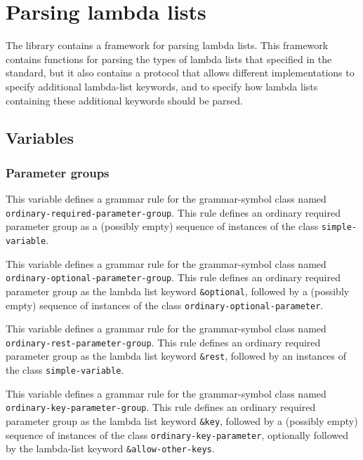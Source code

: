 \chapter{Parsing lambda lists}
\label{chap-user-parsing-lambda-lists}

The \sysname{} library contains a framework for parsing lambda lists.
This framework contains functions for parsing the types of lambda
lists that specified in the \commonlisp{} standard, but it also
contains a protocol that allows different implementations to specify
additional lambda-list keywords, and to specify how lambda lists
containing these additional keywords should be parsed.

\section{Variables}

\subsection{Parameter groups}


This variable defines a grammar rule for the grammar-symbol class
named \texttt{ordinary-required-parameter-group}.  This rule defines
an ordinary required parameter group as a (possibly empty) sequence of
instances of the class \texttt{simple-variable}.


This variable defines a grammar rule for the grammar-symbol class
named \texttt{ordinary-optional-parameter-group}.  This rule defines
an ordinary required parameter group as the lambda list keyword
\texttt{\&optional}, followed by a (possibly empty) sequence of
instances of the class \texttt{ordinary-optional-parameter}.


This variable defines a grammar rule for the grammar-symbol class
named \texttt{ordinary-rest-parameter-group}.  This rule defines an
ordinary required parameter group as the lambda list keyword
\texttt{\&rest}, followed by an instances of the class
\texttt{simple-variable}.


This variable defines a grammar rule for the grammar-symbol class
named \texttt{ordinary-key-parameter-group}.  This rule defines
an ordinary required parameter group as the lambda list keyword
\texttt{\&key}, followed by a (possibly empty) sequence of
instances of the class \texttt{ordinary-key-parameter}, optionally
followed by the lambda-list keyword \texttt{\&allow-other-keys}.

